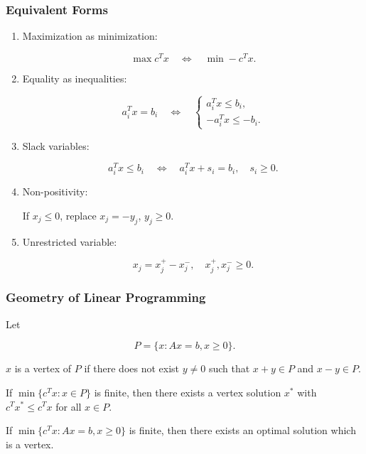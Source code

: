 \subsubsection*{Equivalent Forms}

\begin{enumerate}

\item Maximization as minimization:

\[
\max c^T x \quad \Longleftrightarrow \quad \min -c^T x.
\]

\item Equality as inequalities:

\[
a_i^T x = b_i
\quad \Longleftrightarrow \quad
\begin{cases}
a_i^T x \le b_i, \\
-a_i^T x \le -b_i.
\end{cases}
\tag{LP-2}
\]

\item Slack variables:

\[
a_i^T x \le b_i
\quad \Longleftrightarrow \quad
a_i^T x + s_i = b_i,
\quad s_i \ge 0.
\]

\item Non-positivity:

If $x_j \le 0$, replace $x_j = -y_j$, $y_j \ge 0$.

\item Unrestricted variable:

\[
x_j = x_j^+ - x_j^-,
\quad x_j^+, x_j^- \ge 0.
\]
\end{enumerate}

\subsubsection*{Geometry of Linear Programming}

Let

\[
P = \{x : Ax=b, x \ge 0\}.
\]

\begin{Def}
$x$ is a vertex of $P$ if there does not exist $y \neq 0$ such that
$x+y \in P$ and $x-y \in P$.
\end{Def}

\begin{Teo}  
If $\min \{c^T x : x\in P\}$ is finite, then there exists a vertex solution $x^*$ with
$c^T x^* \le c^T x$ for all $x \in P$.
\end{Teo}


\begin{Coro}
If $\min\{c^T x : Ax=b, x\ge 0\}$ is finite, then there exists an optimal solution which is a vertex.
\end{Coro}


